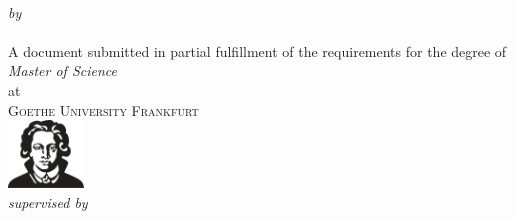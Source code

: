 \begin{titlepage}
  \vspace*{5cm}
  \makeatletter
  \begin{center}
    \begin{Huge}
      \@title
    \end{Huge}\\[0.1cm]
    \emph{by}\\
    \@author\\[\baselineskip]
    \@date
    \vfill
    A document submitted in partial fulfillment
    of the requirements for the degree of\\
    \emph{Master of Science}\\
    at\\
    \textsc{Goethe University Frankfurt}\\[2\baselineskip]
    \includegraphics[width=2cm]{Figures/Goethe_Logo} \\
    \emph{supervised by} \\
    \supervisor
  \end{center}
  \makeatother
\end{titlepage}
\restoregeometry

\newpage
\null
\thispagestyle{empty}
\newpage
